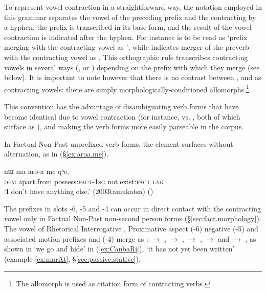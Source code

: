 To represent vowel contraction in a straightforward way, the notation employed in this grammar separates the vowel of the preceding prefix and the contracting by a hyphen, the prefix is transcribed in its base form, and the result of the vowel contraction is indicated after the hyphen. For instance  is to be read as `prefix  merging with the contracting vowel as ', while  indicates merger of the preverb with the contracting vowel as . This orthographic rule transcribes contracting vowels in several ways (,  or ) depending on the prefix with which they merge (see  below). It is important to note however that there is no contrast between ,  and  as contracting vowels: there are simply morphologically-conditioned allomorphs.\footnote{The  allomorph is used as citation form of contracting verbs. }
 
 This convention has the advantage of disambiguating verb forms that have become identical due to vowel contraction (for instance,  vs. , both of which surface as ), and making the verb forms more easily parseable in the corpus.
 
 In Factual Non-Past unprefixed verb forms, the  element surfaces without alternation, as in (§\ref{ex:aroa.me}). 
 
 \begin{exe}
 	\ex \label{ex:aroa.me}
 	\gll nɯ ma aro-a me qʰe, \\
 	\textsc{dem} apart.from possess:\textsc{fact}-\textsc{1sg} not.exist:\textsc{fact} \textsc{lnk} \\
 	\glt `I don't have anything else.' (2003tamukatsa)
()
 \end{exe}
 
 The prefixes in slots -6, -5 and -4 can occur in direct contact with the contracting vowel  only in Factual Non-Past non-second person forms (§\ref{sec:fact.morphology}). The vowel of Rhetorical Interrogative , Proximative aspect  (-6) negative  (-5) and associated motion prefixes  and  (-4) merge as :  $\rightarrow$ ,  $\rightarrow$ ,  $\rightarrow$ ,  $\rightarrow$  and  $\rightarrow$ , as shown in  `we go and hide'  in (\ref{ex:CanbaRi}),  `it has not yet been written'  (example \ref{ex:marAt}, §\ref{sec:passive.stative}).
 

